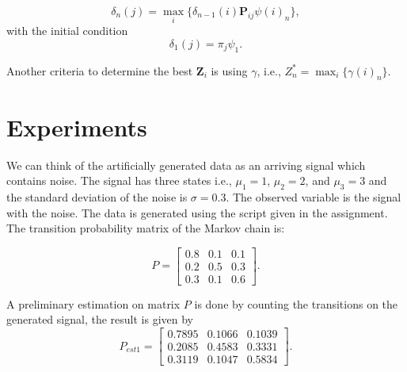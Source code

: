 \documentclass[letterpaper, 10 pt, conference]{ieeeconf}  %
\begin{document}
\begin{equation*}
   \delta_{n}(j) = \max_{i}{ \{ \delta_{n-1}(i) \mathbf{P}_{ij}  \psi(i)_{n} \}},
\end{equation*}
with the initial condition
\begin{equation*}
   \delta_{1}(j) =   \pi_{j}  \psi_{1} .
\end{equation*}

Another criteria to determine the best  $\mathbf{Z}_{i}$ is using $\gamma$, i.e., $Z_{n}^{\ast} =  \max_{i}{  \{ \gamma(i)_{n} \}} $.


\section{Experiments}
\label{sec:Experiments}

We can think of the artificially generated data as an arriving signal which contains noise. The signal has three states i.e., $\mu_{1} = 1$, $\mu_{2} = 2$, 
and $\mu_{3} = 3$ and the standard deviation of the noise is $\sigma = 0.3$. The observed variable is the signal with the noise. The data is generated 
using the script given in the assignment. The transition probability matrix of the Markov chain is:

\begin{equation*}
 P = \begin{bmatrix}
            0.8 & 0.1 & 0.1 \\
            0.2 & 0.5 & 0.3 \\
            0.3 & 0.1 & 0.6 
        \end{bmatrix}.
\end{equation*}  

A preliminary estimation on matrix $P$ is done by counting the transitions on the generated signal, the result is given by 
\begin{equation*}
 P_{est1} = \begin{bmatrix}
           0.7895 & 0.1066 & 0.1039\\
           0.2085 & 0.4583 & 0.3331\\
           0.3119 & 0.1047 & 0.5834
        \end{bmatrix}.
\end{equation*}  
\end{document}
